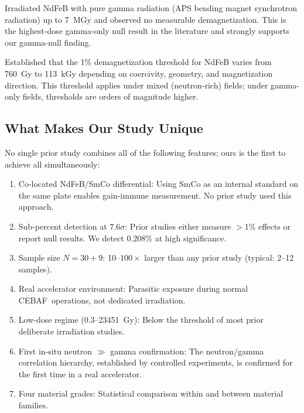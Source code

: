 \documentclass[11pt,letterpaper]{article}
\newcommand{\CEBAF}{CEBAF}
\begin{document}
\begin{description}[style=nextline]
    \item[Alderman et al.\ \cite{Alderman}]
    Irradiated NdFeB with pure gamma radiation (APS bending magnet
    synchrotron radiation) up to \SI{7}{MGy} and observed no
    measurable demagnetization. This is the highest-dose gamma-only null
    result in the literature and strongly supports our gamma-null finding.

    \item[APS LS-290 \cite{APSLS290}]
    Established that the 1\% demagnetization threshold for NdFeB varies from
    \SI{760}{Gy} to \SI{113}{kGy} depending on coercivity, geometry, and
    magnetization direction. This threshold applies under mixed (neutron-rich)
    fields; under gamma-only fields, thresholds are orders of magnitude higher.
\end{description}

\subsection{What Makes Our Study Unique}

No single prior study combines all of the following features; ours is the
first to achieve all simultaneously:

\begin{enumerate}
    \item Co-located NdFeB/SmCo differential: Using SmCo as an
    internal standard on the same plate enables gain-immune measurement. No
    prior study used this approach.

    \item Sub-percent detection at $7.6\sigma$: Prior studies either
    measure $>$1\% effects or report null results. We detect $0.208\%$ at
    high significance.

    \item Sample size $N = 30 + 9$: 10--$100\times$ larger than any
    prior study (typical: 2--12 samples).

    \item Real accelerator environment: Parasitic exposure during
    normal \CEBAF~operations, not dedicated irradiation.

    \item Low-dose regime (0.3--\SI{23451}{Gy}): Below the threshold
    of most prior deliberate irradiation studies.

    \item First in-situ neutron $\gg$ gamma confirmation: The
    neutron/gamma correlation hierarchy, established by controlled experiments,
    is confirmed for the first time in a real accelerator.

    \item Four material grades: Statistical comparison within and
    between material families.
\end{enumerate}
\end{document}
